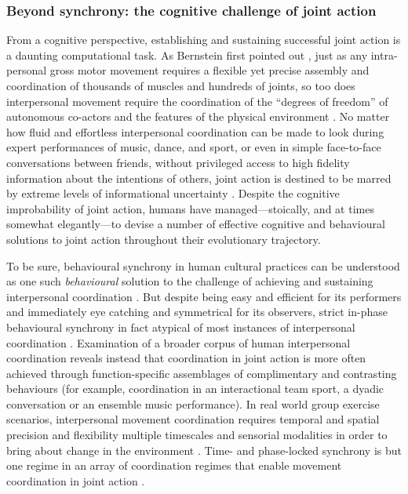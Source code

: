\begin{CJK}{UTF8}{gbsn}
\subsubsection{Beyond synchrony: the cognitive challenge of joint action}
From a cognitive perspective, establishing and sustaining successful joint action is a daunting computational task.  As Bernstein first pointed out \textcite{Bernstein1967}, just as any intra-personal gross motor movement requires a flexible yet precise assembly and coordination of thousands of muscles and hundreds of joints, so too does interpersonal movement require the coordination of the ``degrees of freedom'' of autonomous co-actors and the features of the physical environment \citep{Riley2011}.  No matter how fluid and effortless interpersonal coordination can be made to look during expert performances of music, dance, and sport, or even in simple face-to-face conversations between friends, without privileged access to high fidelity information about the intentions of others, joint action is destined to be marred by extreme levels of informational uncertainty \citep{Sebanz2009,Fusaroli2014}.  Despite the cognitive improbability of joint action, humans have managed---stoically, and at times somewhat elegantly---to devise a number of effective cognitive and behavioural solutions to joint action throughout their evolutionary trajectory.

To be sure, behavioural synchrony in human cultural practices can be understood as one such \textit{behavioural} solution to the challenge of achieving and sustaining interpersonal coordination \citep{Kirschner2010}.  But despite being easy and efficient for its performers and immediately eye catching and symmetrical for its observers, strict in-phase behavioural synchrony in fact atypical of most instances of interpersonal coordination \citep{Fusaroli2014}.  Examination of a broader corpus of human interpersonal coordination reveals instead that coordination in joint action is more often achieved through function-specific assemblages of complimentary and contrasting behaviours (for example, coordination in an interactional team sport, a dyadic conversation or an ensemble music performance).  In real world group exercise scenarios, interpersonal movement coordination requires temporal and spatial precision and flexibility multiple timescales and sensorial modalities in order to bring about change in the environment \citep{Sebanz2006}.  Time- and phase-locked synchrony is but one regime in an array of coordination regimes that enable movement coordination in joint action \citep{Kelso2013}.


\end{CJK}
